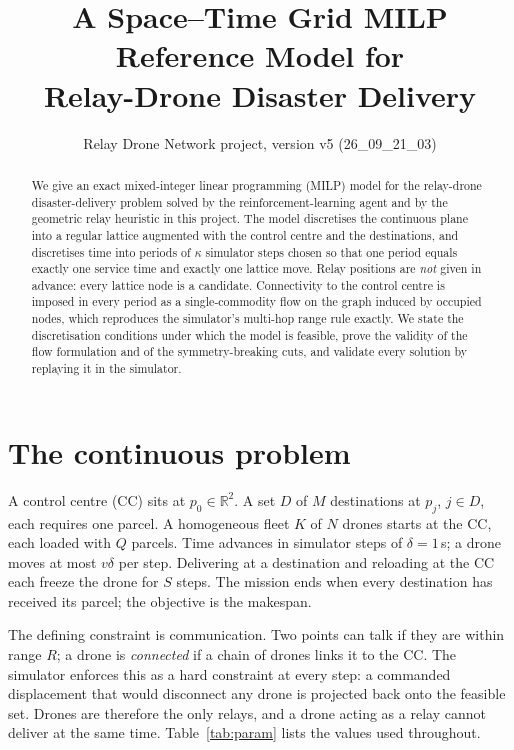 \documentclass[11pt]{article}
\title{A Space--Time Grid MILP Reference Model for\\Relay-Drone Disaster Delivery}
\author{Relay Drone Network project, version v5 (26\_09\_21\_03)}
\date{}
\begin{document}
\maketitle

\begin{abstract}
We give an exact mixed-integer linear programming (MILP) model for the relay-drone
disaster-delivery problem solved by the reinforcement-learning agent and by the geometric
relay heuristic in this project. The model discretises the continuous plane into a regular
lattice augmented with the control centre and the destinations, and discretises time into
periods of $\kappa$ simulator steps chosen so that one period equals exactly one service
time and exactly one lattice move. Relay positions are \emph{not} given in advance: every
lattice node is a candidate. Connectivity to the control centre is imposed in every period
as a single-commodity flow on the graph induced by occupied nodes, which reproduces the
simulator's multi-hop range rule exactly. We state the discretisation conditions under
which the model is feasible, prove the validity of the flow formulation and of the
symmetry-breaking cuts, and validate every solution by replaying it in the simulator.
\end{abstract}

\section{The continuous problem}

A control centre (CC) sits at $p_0 \in \mathbb{R}^2$. A set $D$ of $M$ destinations at
$p_j$, $j \in D$, each requires one parcel. A homogeneous fleet $K$ of $N$ drones starts at
the CC, each loaded with $Q$ parcels. Time advances in simulator steps of $\delta = 1$\,s;
a drone moves at most $v\delta$ per step. Delivering at a destination and reloading at the
CC each freeze the drone for $S$ steps. The mission ends when every destination has
received its parcel; the objective is the makespan.

The defining constraint is communication. Two points can talk if they are within range $R$;
a drone is \emph{connected} if a chain of drones links it to the CC. The simulator enforces
this as a hard constraint at every step: a commanded displacement that would disconnect any
drone is projected back onto the feasible set. Drones are therefore the only relays, and a
drone acting as a relay cannot deliver at the same time. Table~\ref{tab:param} lists the
values used throughout.
\end{document}
